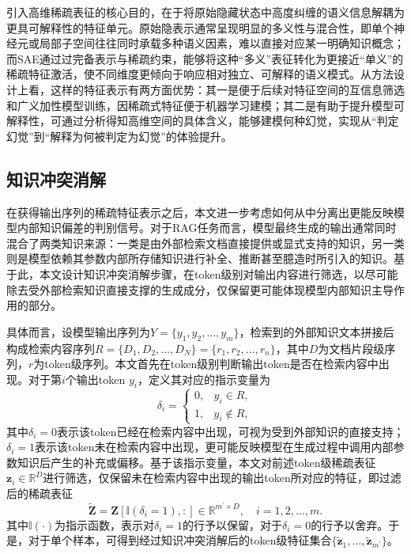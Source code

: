 引入高维稀疏表征的核心目的，在于将原始隐藏状态中高度纠缠的语义信息解耦为更具可解释性的特征单元。原始隐表示通常呈现明显的多义性与混合性，即单个神经元或局部子空间往往同时承载多种语义因素，难以直接对应某一明确知识概念；而SAE通过过完备表示与稀疏约束，能够将这种“多义”表征转化为更接近“单义”的稀疏特征激活，使不同维度更倾向于响应相对独立、可解释的语义模式\cite{shu2025survey,bricken2023towards,huben2024sparse,xiong2025toward}。从方法设计上看，这样的特征表示有两方面优势：其一是便于后续对特征空间的互信息筛选和广义加性模型训练，因稀疏式特征便于机器学习建模；其二是有助于提升模型可解释性，可通过分析得知高维空间的具体含义，能够建模何种幻觉，实现从“判定幻觉”到“解释为何被判定为幻觉”的体验提升。

\subsection{知识冲突消解}\label{subsec:knowledge_conflict_resolution}


在获得输出序列的稀疏特征表示之后，本文进一步考虑如何从中分离出更能反映模型内部知识偏差的判别信号。对于RAG任务而言，模型最终生成的输出通常同时混合了两类知识来源：一类是由外部检索文档直接提供或显式支持的知识，另一类则是模型依赖其参数内部所存储知识进行补全、推断甚至臆造时所引入的知识。基于此，本文设计知识冲突消解步骤，在token级别对输出内容进行筛选，以尽可能除去受外部检索知识直接支撑的生成成分，仅保留更可能体现模型内部知识主导作用的部分。

具体而言，设模型输出序列为$Y=\{y_1,y_2,\dots,y_m\}$，检索到的外部知识文本拼接后构成检索内容序列$R=\{D_1, D_2, \dots, D_N\}=\{r_1,r_2,\dots,r_n\}$，其中$D$为文档片段级序列，$r$为token级序列。本文首先在token级别判断输出token是否在检索内容中出现。对于第$i$个输出token $y_i$，定义其对应的指示变量为
\begin{equation}
\delta_i=
\begin{cases}
0, & y_i\in R,\\
1, & y_i\notin R,
\end{cases}
\end{equation}
其中$\delta_i=0$表示该token已经在检索内容中出现，可视为受到外部知识的直接支持；$\delta_i=1$表示该token未在检索内容中出现，更可能反映模型在生成过程中调用内部参数知识后产生的补充或偏移。基于该指示变量，本文对前述token级稀疏表征$\mathbf{z}_i\in\mathbb{R}^{D}$进行筛选，仅保留未在检索内容中出现的输出token所对应的特征，即过滤后的稀疏表征
\begin{equation}
\widetilde{\mathbf{Z}}=\mathbf{Z}\left[\mathbb{I}\left(\delta_i=1\right),:\right]\in\mathbb{R}^{m^\prime\times D},\quad i=1,2,\dots,m.
\end{equation}
其中$\mathbb{I}(\cdot)$为指示函数，表示对$\delta_i=1$的行予以保留，对于$\delta_i=0$的行予以舍弃。于是，对于单个样本，可得到经过知识冲突消解后的token级特征集合$\{\tilde{\mathbf{z}}_1,\dots,\tilde{\mathbf{z}}_{m^\prime}\}$。

